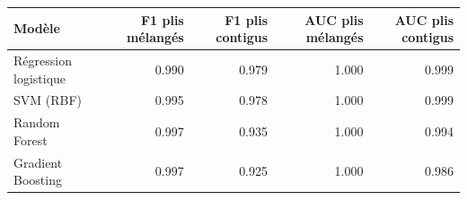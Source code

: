 \begin{tabular}{lrrrr}
\toprule
Modèle & F1 plis mélangés & F1 plis contigus & AUC plis mélangés & AUC plis contigus \\
\midrule
Régression logistique & 0.990 & 0.979 & 1.000 & 0.999 \\
SVM (RBF) & 0.995 & 0.978 & 1.000 & 0.999 \\
Random Forest & 0.997 & 0.935 & 1.000 & 0.994 \\
Gradient Boosting & 0.997 & 0.925 & 1.000 & 0.986 \\
\bottomrule
\end{tabular}